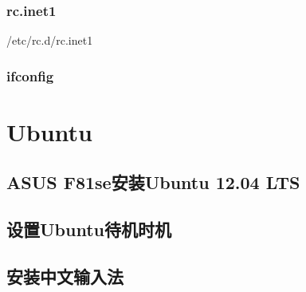 \documentclass[paper=a4,fontsize=11pt]{article}
\begin{document}
	\subsubsection{rc.inet1}
	/etc/rc.d/rc.inet1
	\subsubsection{ifconfig}
	
	\section{Ubuntu}
	
	\subsection{ASUS F81se安装Ubuntu 12.04 LTS}
	
	\subsection{设置Ubuntu待机时机}
	
	\subsection{安装中文输入法}
	
\end{document}
